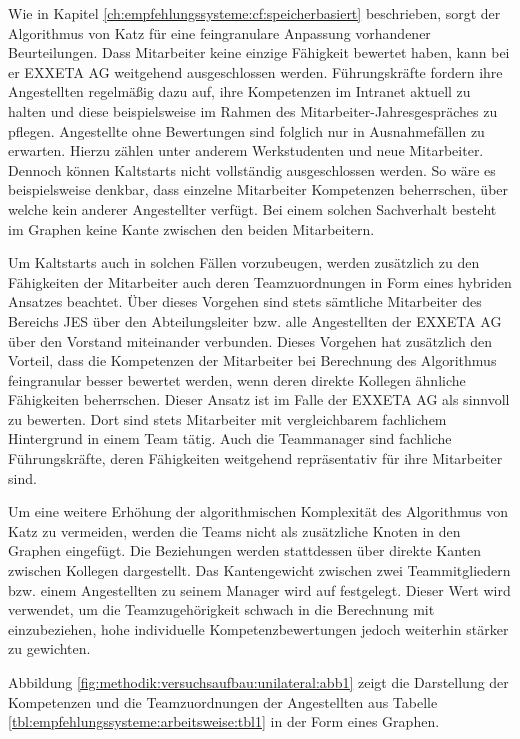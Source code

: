Wie in Kapitel \ref{ch:empfehlungssysteme:cf:speicherbasiert} beschrieben, sorgt der Algorithmus von Katz für eine feingranulare Anpassung vorhandener Beurteilungen. Dass Mitarbeiter keine einzige Fähigkeit bewertet haben, kann bei er EXXETA AG weitgehend ausgeschlossen werden. Führungskräfte fordern ihre Angestellten regelmäßig dazu auf, ihre Kompetenzen im Intranet aktuell zu halten und diese beispielsweise im Rahmen des Mitarbeiter-Jahresgespräches zu pflegen. Angestellte ohne Bewertungen sind folglich nur in Ausnahmefällen zu erwarten. Hierzu zählen unter anderem Werkstudenten und neue Mitarbeiter. Dennoch können Kaltstarts nicht vollständig ausgeschlossen werden. So wäre es beispielsweise denkbar, dass einzelne Mitarbeiter Kompetenzen beherrschen, über welche kein anderer Angestellter verfügt. Bei einem solchen Sachverhalt besteht im Graphen keine Kante zwischen den beiden Mitarbeitern.

Um Kaltstarts auch in solchen Fällen vorzubeugen, werden zusätzlich zu den Fähigkeiten der Mitarbeiter auch deren Teamzuordnungen in Form eines hybriden Ansatzes beachtet. Über dieses Vorgehen sind stets sämtliche Mitarbeiter des Bereichs \acl{JES} über den Abteilungsleiter bzw. alle Angestellten der EXXETA AG über den Vorstand miteinander verbunden. Dieses Vorgehen hat zusätzlich den Vorteil, dass die Kompetenzen der Mitarbeiter bei Berechnung des Algorithmus feingranular besser bewertet werden, wenn deren direkte Kollegen ähnliche Fähigkeiten beherrschen. Dieser Ansatz ist im Falle der EXXETA AG als sinnvoll zu bewerten. Dort sind stets Mitarbeiter mit vergleichbarem fachlichem Hintergrund in einem Team tätig. Auch die Teammanager sind fachliche Führungskräfte, deren Fähigkeiten weitgehend repräsentativ für ihre Mitarbeiter sind.

Um eine weitere Erhöhung der algorithmischen Komplexität des Algorithmus von Katz zu vermeiden, werden die Teams nicht als zusätzliche Knoten in den Graphen eingefügt. Die Beziehungen werden stattdessen über direkte Kanten zwischen Kollegen dargestellt. Das Kantengewicht zwischen zwei Teammitgliedern bzw. einem Angestellten zu seinem Manager wird auf \teamgewichtString festgelegt. Dieser Wert wird verwendet, um die Teamzugehörigkeit schwach in die Berechnung mit einzubeziehen, hohe individuelle Kompetenzbewertungen jedoch weiterhin stärker zu gewichten.

Abbildung \ref{fig:methodik:versuchsaufbau:unilateral:abb1} zeigt die Darstellung der Kompetenzen und die Teamzuordnungen der Angestellten aus Tabelle \ref{tbl:empfehlungssysteme:arbeitsweise:tbl1} in der Form eines Graphen.

